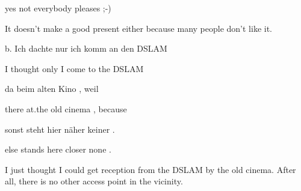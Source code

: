\begin{styleMoutonExampleAlphaGloss}
yes  not    everybody  pleases  ;-)
\end{styleMoutonExampleAlphaGloss}

\begin{styleMoutonExamplesTransAlpha}
It doesn’t make a good present either because many people don’t like it.
\end{styleMoutonExamplesTransAlpha}

\begin{styleMoutonExampleAlpha}
b.  Ich  dachte  nur  ich  komm  an  den  DSLAM
\end{styleMoutonExampleAlpha}

\begin{styleMoutonExampleAlphaGloss}
I  thought  only  I  come    to  the  DSLAM
\end{styleMoutonExampleAlphaGloss}

\begin{styleMoutonExampleAlphaGloss}
da  beim    alten    Kino    ,  weil
\end{styleMoutonExampleAlphaGloss}

\begin{styleMoutonExampleAlphaGloss}
there  at.the    old    cinema  ,  because
\end{styleMoutonExampleAlphaGloss}

\begin{styleMoutonExampleAlphaGloss}
sonst  steht    hier    näher    keiner  .
\end{styleMoutonExampleAlphaGloss}

\begin{styleMoutonExampleAlphaGloss}
else  stands  here    closer  none    .
\end{styleMoutonExampleAlphaGloss}

\begin{styleMoutonExamplesTransAlpha}
I just thought I could get reception from the DSLAM by the old cin\-ema. After all, there is no other access point in the vicinity.
\end{styleMoutonExamplesTransAlpha}

